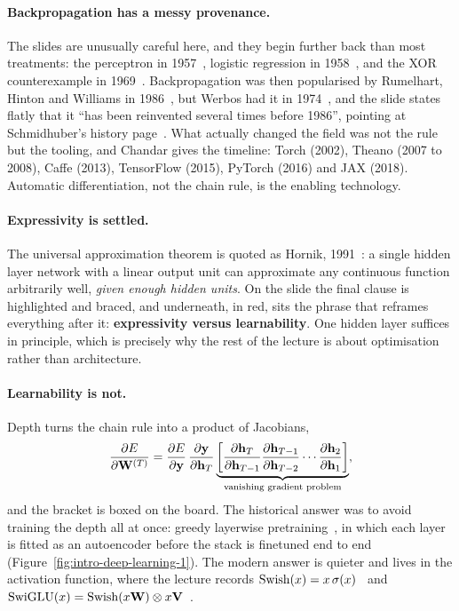\paragraph{Backpropagation has a messy provenance.} The slides are unusually careful here, and they
begin further back than most treatments: the perceptron in 1957~\citep{rosenblatt1958}, logistic
regression in 1958~\citep{cox1958}, and the XOR counterexample in 1969~\citep{minsky1969}.
Backpropagation was then popularised by Rumelhart, Hinton and Williams in
1986~\citep{rumelhart1986}, but Werbos had it in 1974~\citep{werbos1974}, and the slide
states flatly that it ``has been reinvented several times before 1986'', pointing at
Schmidhuber's history page~\citep{schmidhuber2014backprop}. What actually changed the field
was not the rule but the tooling, and Chandar gives the timeline: Torch (2002), Theano
(2007 to 2008), Caffe (2013), TensorFlow (2015), PyTorch (2016) and JAX (2018). Automatic
differentiation, not the chain rule, is the enabling technology.

\paragraph{Expressivity is settled.} The universal approximation theorem is quoted as
Hornik, 1991~\citep{hornik1991}: a single hidden layer network with a linear output unit can
approximate any continuous function arbitrarily well, \emph{given enough hidden units}. On
the slide the final clause is highlighted and braced, and underneath, in red, sits the
phrase that reframes everything after it: \textbf{expressivity versus learnability}. One
hidden layer suffices in principle, which is precisely why the rest of the lecture is about
optimisation rather than architecture.

\paragraph{Learnability is not.} Depth turns the chain rule into a product of Jacobians,
\[
  \frac{\partial E}{\partial \mathbf{W}^{(T)}}
   = \frac{\partial E}{\partial \mathbf{y}}\,
     \frac{\partial \mathbf{y}}{\partial \mathbf{h}_T}
     \underbrace{\left[
       \frac{\partial \mathbf{h}_T}{\partial \mathbf{h}_{T-1}}
       \frac{\partial \mathbf{h}_{T-1}}{\partial \mathbf{h}_{T-2}} \cdots
       \frac{\partial \mathbf{h}_2}{\partial \mathbf{h}_1}
     \right]}_{\text{vanishing gradient problem}},
\]
\noindent and the bracket is boxed on the board. The historical answer was to avoid
training the depth all at once: greedy layerwise pretraining~\citep{hinton2006, bengio2007},
in which each layer is fitted as an autoencoder before the stack is finetuned end to end
(Figure~\ref{fig:intro-deep-learning-1}). The modern answer is quieter and lives in the
activation function, where the lecture records
$\mathrm{Swish}(x) = x\,\sigma(x)$~\citep{ramachandran2017} and
$\mathrm{SwiGLU}(x) = \mathrm{Swish}(x\mathbf{W}) \otimes x\mathbf{V}$~\citep{shazeer2020}.


